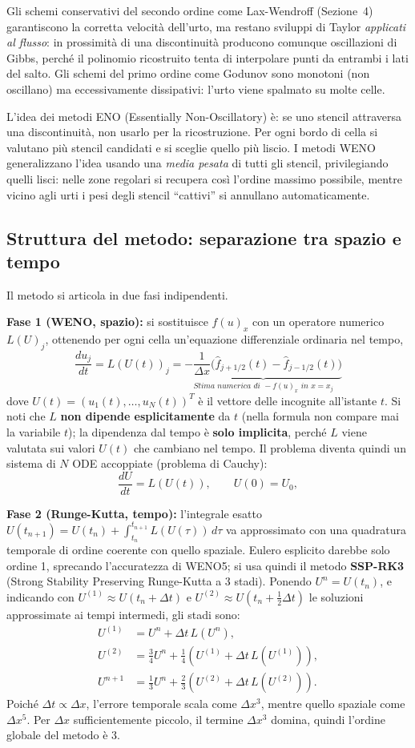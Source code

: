 \documentclass[12pt]{article}
\begin{document}
Gli schemi conservativi del secondo ordine come Lax-Wendroff (Sezione~4) garantiscono la corretta velocità dell'urto, ma restano sviluppi di Taylor \emph{applicati al flusso}: in prossimità di una discontinuità producono comunque oscillazioni di Gibbs, perché il polinomio ricostruito tenta di interpolare punti da entrambi i lati del salto. Gli schemi del primo ordine come Godunov sono monotoni (non oscillano) ma eccessivamente dissipativi: l'urto viene spalmato su molte celle.

L'idea dei metodi ENO (Essentially Non-Oscillatory) è: se uno stencil attraversa una discontinuità, non usarlo per la ricostruzione. Per ogni bordo di cella si valutano più stencil candidati e si sceglie quello più liscio. I metodi WENO generalizzano l'idea usando una \emph{media pesata} di tutti gli stencil, privilegiando quelli lisci: nelle zone regolari si recupera così l'ordine massimo possibile, mentre vicino agli urti i pesi degli stencil ``cattivi'' si annullano automaticamente.

\subsection{Struttura del metodo: separazione tra spazio e tempo}
Il metodo si articola in due fasi indipendenti.

\textbf{Fase 1 (WENO, spazio):} si sostituisce \(f(u)_x\) con un operatore numerico \(L(U)_j\), ottenendo per ogni cella un'equazione differenziale ordinaria nel tempo,
\[
\frac{du_j}{dt} = L(U(t))_j = \underbrace{-\frac{1}{\Delta x}\bigl(\hat f_{j+1/2}(t)-\hat f_{j-1/2}(t)\bigr)}_{\textit{Stima numerica di } -f(u)_x \textit{ in } x=x_j}\]
dove \(U(t)=(u_1(t),\dots,u_N(t))^T\) è il vettore delle incognite all'istante \(t\). 
Si noti che \(L\) \textbf{non dipende esplicitamente} da \(t\) (nella formula non compare mai la variabile \(t\)); la dipendenza dal tempo è \textbf{solo implicita}, perché \(L\) viene valutata sui valori \(U(t)\) che cambiano nel tempo.
Il problema diventa quindi un sistema di \(N\) ODE accoppiate (problema di Cauchy):
\[
\frac{dU}{dt} = L(U(t)), \qquad U(0)=U_0,
\]

\textbf{Fase 2 (Runge-Kutta, tempo):} l'integrale esatto 
\(U(t_{n+1})=U(t_n)+\int_{t_n}^{t_{n+1}} L(U(\tau))\,d\tau\) 
va approssimato con una quadratura temporale di ordine coerente con quello spaziale. Eulero esplicito darebbe solo ordine 1, sprecando l'accuratezza di WENO5; si usa quindi il metodo \textbf{SSP-RK3} (Strong Stability Preserving Runge-Kutta a 3 stadi). 
Ponendo \(U^n = U(t_n)\), e indicando con \(U^{(1)} \approx U(t_n+\Delta t)\) e \(U^{(2)} \approx U(t_n+\tfrac12\Delta t)\) le soluzioni approssimate ai tempi intermedi, gli stadi sono:
\[
\begin{aligned}
U^{(1)} &= U^n + \Delta t\,L(U^n), \\[4pt]
U^{(2)} &= \tfrac34 U^n + \tfrac14 (U^{(1)} + \Delta t\,L(U^{(1)})), \\[4pt]
U^{n+1} &= \tfrac13 U^n + \tfrac23 (U^{(2)} + \Delta t\,L(U^{(2)})).
\end{aligned}
\]
Poiché \(\Delta t \propto \Delta x\), l'errore temporale scala come \(\Delta x^3\), mentre quello spaziale come \(\Delta x^5\). Per \(\Delta x\) sufficientemente piccolo, il termine \(\Delta x^3\) domina, quindi l'ordine globale del metodo è 3.
\end{document}
